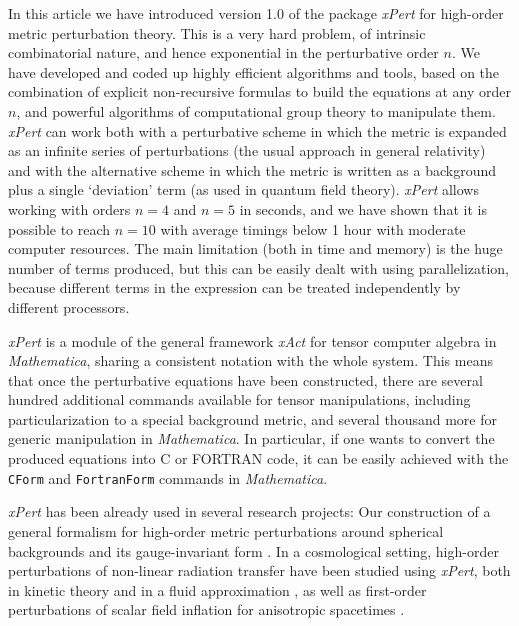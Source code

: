 \documentclass[aps,prd,showpacs]{revtex4}
\newcommand{\xPert}{{\em \lowercase{x}P\lowercase{ert}}}
\begin{document}
In this article we have introduced version 1.0 of the package
\xPert\/ for high-order metric perturbation theory. This is a very hard
problem, of intrinsic combinatorial nature, and hence exponential in
the perturbative order $n$. We have developed and coded up highly
efficient algorithms and tools, based on the combination of
explicit non-recursive formulas to build the equations at any order
$n$, and powerful algorithms of computational group theory to manipulate
them. \xPert\/ can work both with a perturbative scheme in which the
metric is expanded as an infinite series of perturbations (the usual
approach in general relativity) and with the alternative scheme in
which the metric is written as a background plus a single `deviation'
term (as used in quantum field theory).
\xPert\/ allows working with orders $n=4$ and $n=5$ in seconds,
and we have shown that it is possible to reach $n=10$ with average timings
below 1 hour with moderate computer resources. The main limitation (both
in time and memory) is the huge number of terms produced, but this can
be easily dealt with using parallelization, because different terms in
the expression can be treated independently by different processors.

\xPert\/ is a module of the general framework {\em xAct} \cite{xAct}
for tensor computer algebra in {\em Mathematica}, sharing a consistent
notation with the whole system. This means that once the perturbative
equations have been constructed, there are several hundred additional
commands available for tensor manipulations, including particularization
to a special background metric, and several thousand more for generic
manipulation in {\em Mathematica}. In particular, if one wants to
convert the produced equations into C or FORTRAN code, it can be easily
achieved with the {\tt CForm} and {\tt FortranForm} commands in
{\em Mathematica}.

\xPert\/ has been already used in several research projects: 
Our construction of a general formalism for high-order metric perturbations
around spherical backgrounds \cite{BMM06} and its gauge-invariant form
\cite{BMM07}. In a cosmological setting, high-order perturbations of
non-linear radiation transfer have been studied using \xPert, both in
kinetic theory \cite{Pit07} and in a fluid approximation \cite{Pit08},
as well as first-order perturbations of scalar field inflation for
anisotropic spacetimes \cite{CPU08}. 

\end{document}
